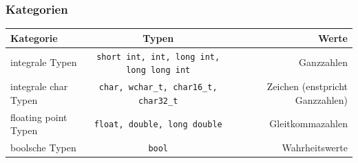\documentclass[a4paper]{report}
\begin{document}
\subsubsection{Kategorien}
 \begin{center}
\begin{tabular}{|l|c|r|}
	\hline
	\textbf{Kategorie} & \textbf{Typen} & \textbf{Werte}\\ \hline 
	integrale Typen & \texttt{short int, int, long int, long long int} & Ganzzahlen \\ 
	integrale char Typen & \texttt{char, wchar\_t, char16\_t, char32\_t} & Zeichen (enstpricht Ganzzahlen) \\
	floating point Typen & \texttt{float, double, long double} & Gleitkommazahlen \\
	boolsche Typen & \texttt{bool} & Wahrheitswerte \\ \hline
\end{tabular}
\end{center}
\end{document}
